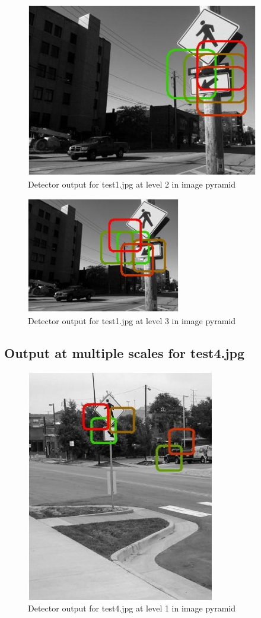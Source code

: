 \documentclass[11pt,psfig]{article}
\begin{document}
\begin{figure}[H]
\centering
\includegraphics[height=3in]{prob5b_plot1_level2.jpg}
\caption{Detector output for test1.jpg at level 2 in image pyramid}
\end{figure}

\begin{figure}[H]
\centering
\includegraphics[height=2in]{prob5b_plot1_level3.jpg}
\caption{Detector output for test1.jpg at level 3 in image pyramid}
\end{figure}

\subsection*{Output at multiple scales for test4.jpg}

\begin{figure}[H]
\centering
\includegraphics[height=4in]{prob5b_plot2_level1.jpg}
\caption{Detector output for test4.jpg at level 1 in image pyramid}
\end{figure}
\end{document}
